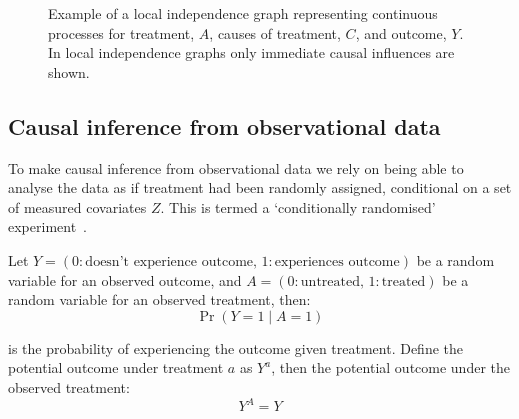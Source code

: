 \begin{figure}[htbp!]
    \centering
    \caption[Example of a local independence graph]{Example of a local independence graph representing continuous processes for treatment, $A$, causes of treatment, $C$, and outcome, $Y$. In local independence graphs only immediate causal influences are shown.}\label{fig:local-independence-graph}
\end{figure}

\subsection{Causal inference from observational data}

To make causal inference from observational data we rely on being able to analyse the data as if treatment had been randomly assigned, conditional on a set of measured covariates $Z$. This is termed a `conditionally randomised' experiment~\parencite{Hernan2023-de}.

Let $Y = (0: \text{doesn't experience outcome, } 1: \text{experiences outcome})$ be a random variable for an observed outcome, and $A = (0: \text{untreated, } 1: \text{treated})$ be a random variable for an observed treatment, then:
%
\[
    \Pr(Y = 1 \mid A = 1)
\]

is the probability of experiencing the outcome given treatment. Define the potential outcome under treatment $a$ as $Y^a$, then the potential outcome under the observed treatment:
%
\[
    Y^A = Y
\]

